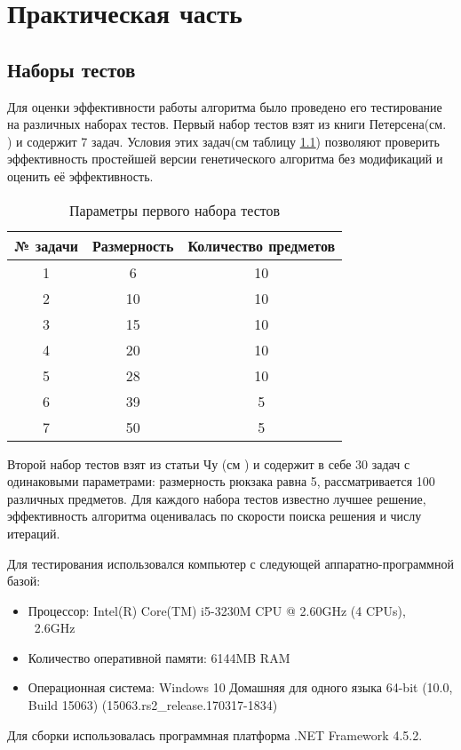 \chapter{Практическая часть}

\section{Наборы тестов}

Для оценки эффективности работы алгоритма было проведено его тестирование на различных наборах тестов.
Первый набор тестов взят из книги Петерсена(см. \cite{Петерсен1967}) и содержит 7 задач. Условия этих задач(см таблицу \ref{table1}) позволяют проверить эффективность простейшей версии генетического алгоритма без модификаций и оценить её эффективность. %

\begin{table}[ht]%
\centering
\begin{tabular}{|c|c|c|}
\hline
№ задачи & Размерность & Количество предметов \\ \hline
1        & 6           & 10                   \\ \hline
2        & 10          & 10                   \\ \hline
3        & 15          & 10                   \\ \hline
4        & 20          & 10                   \\ \hline
5        & 28          & 10                   \\ \hline
6        & 39          & 5                    \\ \hline
7        & 50          & 5                    \\ \hline
\end{tabular}
\caption{Параметры первого набора тестов}
\label{table1}
\end{table}  

Второй набор тестов взят из статьи Чу (см \cite{Чу1998}) и содержит в себе 30 задач с одинаковыми параметрами: размерность рюкзака равна 5, рассматривается 100 различных предметов.
Для каждого набора тестов известно лучшее решение, эффективность алгоритма оценивалась по скорости поиска решения и числу итераций. 

Для тестирования использовался компьютер с следующей аппаратно-программной базой:
\begin{itemize}
\item {Процессор: Intel(R) Core(TM) i5-3230M CPU @ 2.60GHz (4 CPUs), ~2.6GHz}
\item {Количество оперативной памяти: 6144MB RAM}
\item {Операционная система: Windows 10 Домашняя для одного языка 64-bit (10.0, Build 15063) (15063.rs2\_release.170317-1834)}
\end{itemize}
Для сборки использовалась программная платформа .NET Framework 4.5.2.
